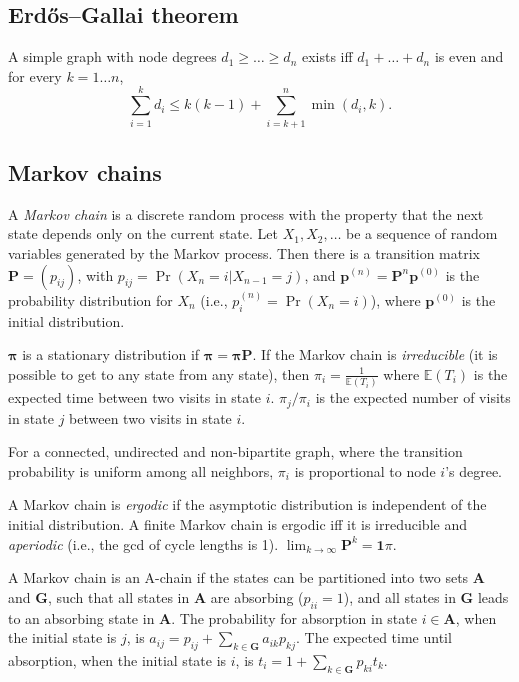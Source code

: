	\subsection{Erdős–Gallai theorem}
		A simple graph with node degrees $d_1 \ge \dots \ge d_n$ exists iff $d_1 + \dots + d_n$ is even and for every $k = 1\dots n$,
		\[ \sum _{i=1}^{k}d_{i}\leq k(k-1)+\sum _{i=k+1}^{n}\min(d_{i},k). \]

	\subsection{Markov chains}
		A \emph{Markov chain} is a discrete random process with the property that the next state depends only on the current state.
		Let $X_1,X_2,\ldots$ be a sequence of random variables generated by the Markov process.
		Then there is a transition matrix $\mathbf{P} = (p_{ij})$, with $p_{ij} = \Pr(X_n = i | X_{n-1} = j)$,
		and $\mathbf{p}^{(n)} = \mathbf P^n \mathbf p^{(0)}$ is the probability distribution for $X_n$ (i.e., $p^{(n)}_i = \Pr(X_n = i)$),
		where $\mathbf{p}^{(0)}$ is the initial distribution.

		$\mathbf{\pi}$ is a stationary distribution if $\mathbf{\pi} = \mathbf{\pi P}$.
		If the Markov chain is \emph{irreducible} (it is possible to get to any state from any state),
		then $\pi_i = \frac{1}{\mathbb{E}(T_i)}$ where $\mathbb{E}(T_i)$  is the expected time between two visits in state $i$.
		$\pi_j/\pi_i$ is the expected number of visits in state $j$ between two visits in state $i$.

		For a connected, undirected and non-bipartite graph, where the transition probability is uniform among all neighbors, $\pi_i$ is proportional to node $i$'s degree.

		A Markov chain is \emph{ergodic} if the asymptotic distribution is independent of the initial distribution.
		A finite Markov chain is ergodic iff it is irreducible and \emph{aperiodic} (i.e., the gcd of cycle lengths is 1).
		$\lim_{k\rightarrow\infty}\mathbf{P}^k = \mathbf{1}\pi$.

		A Markov chain is an A-chain if the states can be partitioned into two sets $\mathbf{A}$ and $\mathbf{G}$, such that all states in $\mathbf{A}$ are absorbing ($p_{ii}=1$), and all states in $\mathbf{G}$ leads to an absorbing state in $\mathbf{A}$.
		The probability for absorption in state $i\in\mathbf{A}$, when the initial state is $j$, is $a_{ij} = p_{ij}+\sum_{k\in\mathbf{G}} a_{ik}p_{kj}$.
		The expected time until absorption, when the initial state is $i$, is $t_i = 1+\sum_{k\in\mathbf{G}}p_{ki}t_k$.
